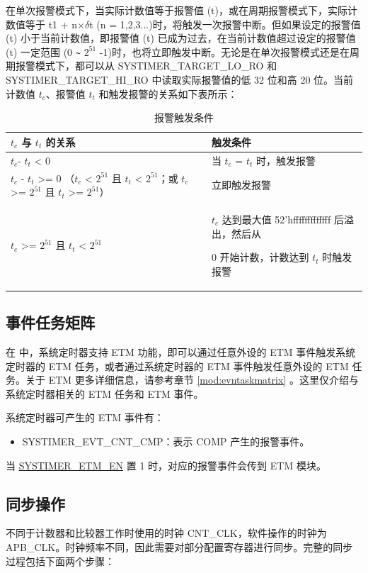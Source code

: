\documentclass[main\_\_CN.tex]{subfiles}
\begin{document}
在单次报警模式下，当实际计数值等于报警值 (t)，或在周期报警模式下，实际计数值等于 t1 + n×$\delta$t (n = 1,2,3...)时，将触发一次报警中断。但如果设定的报警值 (t) 小于当前计数值，即报警值 (t) 已成为过去，在当前计数值超过设定的报警值 (t) 一定范围 (0 \verb+~+ $2^{51}$ -1)时，也将立即触发中断。无论是在单次报警模式还是在周期报警模式下，都可以从 SYSTIMER\_TARGET\_LO\_RO 和 SYSTIMER\_TARGET\_HI\_RO 中读取实际报警值的低 32 位和高 20 位。当前计数值 $t_{c}$、报警值 $t_{t}$ 和触发报警的关系如下表所示：

\begin{longtable}[c]{ | p{4cm} | p{6.5cm} |}
\caption{报警触发条件}
\\\hline
\rowcolor{lightgray}
\textbf{$t_{c}$ 与 $t_{t}$ 的关系}  & \textbf{触发条件} \\ \hline
$t_{c}$- $t_{t}$ < 0 & 当 $t_{c}$ = $t_{t}$ 时，触发报警\\ \hline
$t_{c}$ - $t_{t}$ >= 0 \newline （$t_{c}$ < $2^{51}$ 且 $t_{t}$ < $2^{51}$；\newline 或 $t_{c}$ >= $2^{51}$ 且 $t_{t}$ >= $2^{51}$）& 立即触发报警\\ \hline
\multirow{2}{*}{$t_{c}$ >= $2^{51}$ 且 $t_{t}$ < $2^{51}$} & $t_{c}$ 达到最大值 52'hfffffffffffff 后溢出，然后从

0 开始计数，计数达到 $t_{t}$ 时触发报警 \\ \hline
\end{longtable}

\subsection{事件任务矩阵}
在 \chipname{} 中，系统定时器支持 ETM 功能，即可以通过任意外设的 ETM 事件触发系统定时器的 ETM 任务，或者通过系统定时器的 ETM 事件触发任意外设的 ETM 任务。关于 ETM 更多详细信息，请参考章节 \ref{mod:evntaskmatrix} 。这里仅介绍与系统定时器相关的 ETM 任务和 ETM 事件。

系统定时器可产生的 ETM 事件有：

\begin{itemize}
\item SYSTIMER\_EVT\_CNT\_CMP：表示 COMP 产生的报警事件。
\end{itemize}

当 \hyperref[fielddesc:SYSTIMERETMEN]{SYSTIMER\_ETM\_EN} 置 1 时，对应的报警事件会传到 ETM 模块。

\subsection{同步操作}
不同于计数器和比较器工作时使用的时钟 CNT\_CLK，软件操作的时钟为 APB\_CLK。时钟频率不同，因此需要对部分配置寄存器进行同步。完整的同步过程包括下面两个步骤：
\end{document}
